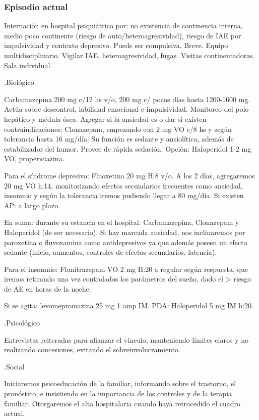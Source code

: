 \documentclass{scrbook}
\begin{document}
\subsubsection*{Episodio actual}
Internación en hospital psiquiátrico por: no existencia de continencia interna, medio poco continente (riesgo de auto/heteroagresividad), riesgo de IAE por impulsividad y contexto depresivo. Puede ser compulsiva. Breve. Equipo multidisciplinario. Vigilar IAE, heteroagresividad, fugas. Visitas continentadoras. Sala individual.

.Biológico

Carbamazepina 200 mg c/12 hs v/o, 200 mg c/ pocos días hasta 1200-1600 mg. Actúa sobre descontrol, labilidad emocional e impulsividad. Monitoreo del polo hepático y médula ósea. Agregar si la ansiedad es o dar si existen contraindicaciones: Clonazepam, empezando con 2 mg VO c/8 hs y según tolerancia hasta 16 mg/día. Su función es sedante y ansiolítica, además de estabilizador del humor. Provee de rápida sedación. Opción: Haloperidol 1-2 mg VO, propericiazina.

Para el síndrome depresivo: Fluoxetina 20 mg H:8 v/o. A los 2 días, agregaremos 20 mg VO h:14, monitorizando efectos secundarios frecuentes como ansiedad, insomnio y según la tolerancia iremos pudiendo llegar a 80 mg/día. Si existen AP: a largo plazo.

En suma: durante su estancia en el hospital: Carbamazepina, Clonazepam y Haloperidol (de ser necesario). Si hay marcada ansiedad, nos inclinaremos por paroxetina o fluvoxamina como antidepresivos ya que además poseen un efecto sedante (inicio, aumentos, controles de efectos secundarios, latencia).

Para el insomnio: Flunitrazepam VO 2 mg H:20 a regular según respuesta, que iremos retirando una vez controlados los parámetros del sueño, dado el > riesgo de AE en horas de la noche.

Si se agita: levomepromazina 25 mg 1 amp IM. PDA: Haloperidol 5 mg IM h:20.

.Psicológico

Entrevistas reiteradas para afianzar el vínculo, manteniendo límites claros y no realizando concesiones, evitando el sobreinvolucramiento.

.Social

Iniciaremos psicoeducación de la familiar, informando sobre el trastorno, el pronóstico, e insistiendo en la importancia de los controles y de la terapia familiar. Otorgaremos el alta hospitalaria cuando haya retrocedido el cuadro actual.
\end{document}

